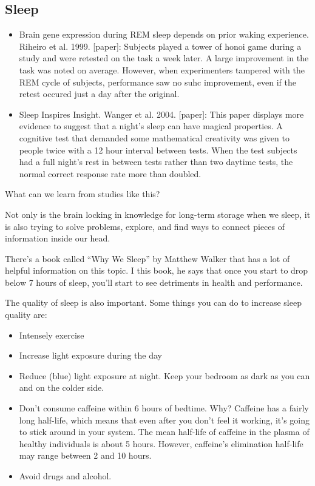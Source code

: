 \subsection{Sleep}

\begin{itemize}
	\item Brain gene expression during REM sleep depends on prior waking experience. Riheiro et al. 1999. [paper]: Subjects played a tower of honoi game during a study and were retested on the task a week later. A large improvement in the task was noted on average. However, when experimenters tampered with the REM cycle of subjects, performance saw no suhc improvement, even if the retest occured just a day after the original. 
	\item Sleep Inspires Insight. Wanger et al. 2004. [paper]: This paper displays more evidence to suggest that a night's sleep can have magical properties. A cognitive test that demanded some mathematical creativity was given to people twice with a 12 hour interval between tests. When the test subjects had a full night's rest in between tests rather than two daytime tests, the normal correct response rate more than doubled.   
\end{itemize}

\begin{quest}
	\item What can we learn from studies like this?
	\begin{ans}
		Not only is the brain locking in knowledge for long-term storage when we sleep, it is also trying to solve problems, explore, and find ways to connect pieces of information inside our head.   
	\end{ans}
\end{quest}

There's a book called ``Why We Sleep'' by Matthew Walker that has a lot of helpful information on this topic. I this book, he says that once you start to drop below 7 hours of sleep, you'll start to see detriments in health and performance. 

The quality of sleep is also important. Some things you can do to increase sleep quality are: 
\begin{itemize}
	\item Intensely exercise
	\item Increase light exposure during the day
	\item Reduce (blue) light exposure at night. Keep your bedroom as dark as you can and on the colder side. 
	\item Don't consume caffeine within 6 hours of bedtime. Why? Caffeine has a fairly long half-life, which means that even after you don't feel it working, it's going to stick around in your system. The mean half-life of caffeine in the plasma of healthy individuals is about 5 hours. However, caffeine's elimination half-life may range between 2 and 10 hours.  
	\item Avoid drugs and alcohol.
\end{itemize}

